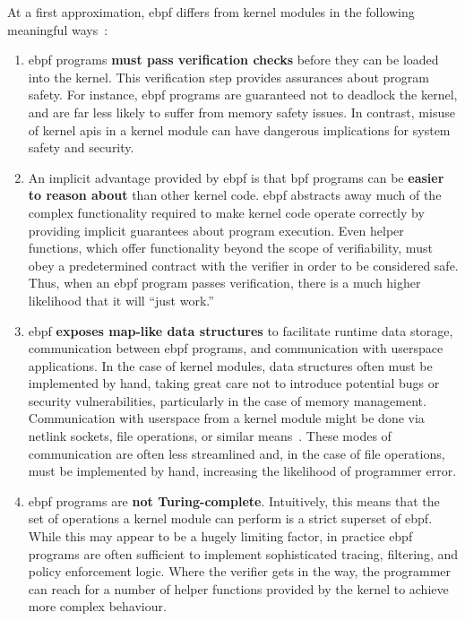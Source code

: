 \documentclass[
  fontsize=12pt,
  titlepage=firstiscover,
  paper=letter,
oneside,
  cleardoublepage=plain,
  parskip=half-,
  DIV=10,
  parindent,
  appendixprefix,
  chapterprefix,
  listof=totoc,
]{scrbook}
\begin{document}
At a first approximation, \gls{ebpf} differs from kernel modules in the following meaningful ways~\cite{gregg2019_bpf}:
\begin{enumerate}
  \item \gls{ebpf} programs \textbf{must pass verification checks} before they can be loaded into the
  kernel. This verification step provides assurances about program safety. For instance, \gls{ebpf}
  programs are guaranteed not to deadlock the kernel, and are far less likely to suffer from
  memory safety issues. In contrast, misuse of kernel \gls{api}s in a kernel module can have dangerous
  implications for system safety and security.

  \item An implicit advantage provided by \gls{ebpf} is that \gls{bpf} programs can be \textbf{easier
  to reason about} than other kernel code. \gls{ebpf} abstracts away much of the complex
  functionality required to make kernel code operate correctly by providing implicit
  guarantees about program execution. Even helper functions, which offer functionality
  beyond the scope of verifiability, must obey a predetermined contract with the verifier
  in order to be considered safe. Thus, when an \gls{ebpf} program passes verification, there is
  a much higher likelihood that it will \enquote{just work.}

  \item \gls{ebpf} \textbf{exposes map-like data structures} to facilitate runtime data storage,
  communication between \gls{ebpf} programs, and communication with userspace applications. In
  the case of kernel modules, data structures often must be implemented by hand, taking
  great care not to introduce potential bugs or security vulnerabilities, particularly in
  the case of memory management. Communication with userspace from a kernel module might
  be done via netlink sockets, file operations, or similar
  means~\cite{corbet1998_device_drivers}. These modes of communication are often less
  streamlined and, in the case of file operations, must be implemented by hand, increasing
  the likelihood of programmer error.

  \item \gls{ebpf} programs are \textbf{not Turing-complete}. Intuitively, this means that
  the set of operations a kernel module can perform is a strict superset of \gls{ebpf}. While
  this may appear to be a hugely limiting factor, in practice \gls{ebpf} programs are often
  sufficient to implement sophisticated tracing, filtering, and policy enforcement logic.
  Where the verifier gets in the way, the programmer can reach for a number of helper
  functions provided by the kernel to achieve more complex behaviour.


\end{enumerate}
\end{document}
